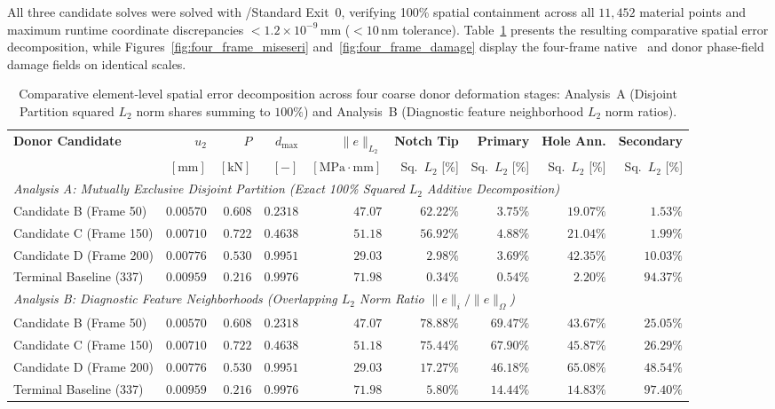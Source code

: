 All three candidate solves were solved with \Abaqus/Standard Exit~0, verifying 100\% spatial containment across all $11{,}452$ material points and maximum runtime coordinate discrepancies $< 1.2 \times 10^{-9}\,\mathrm{mm}$ ($< 10\,\mathrm{nm}$ tolerance). Table~\ref{tab:four_frame_spatial_comparison} presents the resulting comparative spatial error decomposition, while Figures~\ref{fig:four_frame_miseseri} and~\ref{fig:four_frame_damage} display the four-frame native \MISESERI\ and donor phase-field damage fields on identical scales.

\begin{table}[htbp]
\centering
\small
\caption{Comparative element-level spatial error decomposition across four coarse donor deformation stages: Analysis~A (Disjoint Partition squared $L_2$ norm shares summing to $100\%$) and Analysis~B (Diagnostic feature neighborhood $L_2$ norm ratios).}
\label{tab:four_frame_spatial_comparison}
\begin{tabularx}{\textwidth}{lrrrrrrrr}
\hline
\textbf{Donor Candidate} & $u_2$ & $P$ & $d_{\max}$ & $\|e\|_{L_2}$ & \textbf{Notch Tip} & \textbf{Primary} & \textbf{Hole Ann.} & \textbf{Secondary} \\
 & $[\mathrm{mm}]$ & $[\mathrm{kN}]$ & $[-]$ & $[\mathrm{MPa}\cdot\mathrm{mm}]$ & Sq.\ $L_2$ [\%] & Sq.\ $L_2$ [\%] & Sq.\ $L_2$ [\%] & Sq.\ $L_2$ [\%] \\
\hline
\multicolumn{9}{l}{\textit{Analysis A: Mutually Exclusive Disjoint Partition (Exact 100\% Squared $L_2$ Additive Decomposition)}} \\
Candidate B (Frame 50) & $0.00570$ & $0.608$ & $0.2318$ & $47.07$ & $\mathbf{62.22\%}$ & $3.75\%$ & $19.07\%$ & $\mathbf{1.53\%}$ \\
Candidate C (Frame 150) & $0.00710$ & $0.722$ & $0.4638$ & $51.18$ & $\mathbf{56.92\%}$ & $4.88\%$ & $21.04\%$ & $\mathbf{1.99\%}$ \\
Candidate D (Frame 200) & $0.00776$ & $0.530$ & $0.9951$ & $29.03$ & $2.98\%$ & $3.69\%$ & $\mathbf{42.35\%}$ & $10.03\%$ \\
Terminal Baseline (337) & $0.00959$ & $0.216$ & $0.9976$ & $71.98$ & $0.34\%$ & $0.54\%$ & $2.20\%$ & $\mathbf{94.37\%}$ \\
\hline
\multicolumn{9}{l}{\textit{Analysis B: Diagnostic Feature Neighborhoods (Overlapping $L_2$ Norm Ratio $\|e\|_i / \|e\|_{\Omega}$)}} \\
Candidate B (Frame 50) & $0.00570$ & $0.608$ & $0.2318$ & $47.07$ & $\mathbf{78.88\%}$ & $\mathbf{69.47\%}$ & $43.67\%$ & $25.05\%$ \\
Candidate C (Frame 150) & $0.00710$ & $0.722$ & $0.4638$ & $51.18$ & $\mathbf{75.44\%}$ & $\mathbf{67.90\%}$ & $45.87\%$ & $26.29\%$ \\
Candidate D (Frame 200) & $0.00776$ & $0.530$ & $0.9951$ & $29.03$ & $17.27\%$ & $46.18\%$ & $\mathbf{65.08\%}$ & $48.54\%$ \\
Terminal Baseline (337) & $0.00959$ & $0.216$ & $0.9976$ & $71.98$ & $5.80\%$ & $14.44\%$ & $14.83\%$ & $\mathbf{97.40\%}$ \\
\hline
\end{tabularx}
\end{table}

